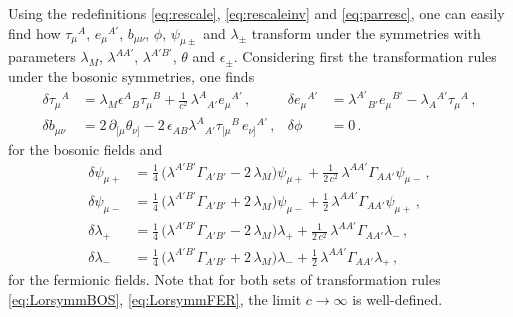 \documentclass[a4paper,10pt,openany]{article}
\begin{document}
	Using the redefinitions \eqref{eq:rescale}, \eqref{eq:rescaleinv} and \eqref{eq:parresc}, one can easily find how $\tau_\mu{}^A$, $e_\mu{}^{A'}$, $b_{\mu\nu}$, $\phi$, $\psi_{\mu\pm}$ and $\lambda_{\pm}$ transform under the symmetries with parameters $\lambda_M$, $\lambda^{AA'}$, $\lambda^{A'B'}$, $\theta$ and $\epsilon_\pm$. Considering first the transformation rules under the bosonic symmetries, one finds
	\begin{subequations}\label{eq:LorsymmBOS}
		\begin{align}
			\delta\tau_\mu{}^A & = \lambda_M\epsilon^A{}_B\tau_\mu{}^B + \frac{1}{c^2}\,\lambda^A{}_{A'}e_\mu{}^{A'}\,, & \delta e_\mu{}^{A'} &= \lambda^{A'}{}_{B'}e_\mu{}^{B'} - \lambda_{A}{}^{A'} \tau_\mu{}^A\,,\\
			\delta b_{\mu\nu} &= 2\,\partial_{[\mu}\theta_{\nu]} - 2\,\epsilon_{AB}\lambda^A{}_{A'}\tau_{[\mu}{}^B\,e_{\nu]}{}^{A'}\,, & \delta\phi &= 0\,.
		\end{align}
	\end{subequations}
	for the bosonic fields and
	\begin{subequations}\label{eq:LorsymmFER}
		\begin{align}
			\delta\psi_{\mu+} &= \frac14\,\big(\lambda^{A'B'}\Gamma_{A'B'}-2\,\lambda_M\big)\psi_{\mu +} + \frac{1}{2\,c^2}\,\lambda^{AA'}\Gamma_{AA'}\psi_{\mu -}\,, \\
			\delta\psi_{\mu-} &= \frac14\,\big(\lambda^{A'B'}\Gamma_{A'B'}+2\,\lambda_M\big)\psi_{\mu -} + \frac{1}{2}\,\lambda^{AA'}\Gamma_{AA'}\psi_{\mu +}\,,\\
			\delta\lambda_+ &= \frac14\,\big(\lambda^{A'B'}\Gamma_{A'B'}-2\,\lambda_M\big)\lambda_+ + \frac{1}{2\,c^2}\,\lambda^{AA'}\Gamma_{AA'}\lambda_-\,,\\
			\delta\lambda_- &= \frac14\,\big(\lambda^{A'B'}\Gamma_{A'B'} + 2\,\lambda_M\big)\lambda_- + \frac{1}{2}\,\lambda^{AA'}\Gamma_{AA'}\lambda_+\,,
		\end{align}
	\end{subequations}
	for the fermionic fields. Note that for both sets of transformation rules \eqref{eq:LorsymmBOS}, \eqref{eq:LorsymmFER}, the limit $c \rightarrow \infty$ is well-defined.
	
\end{document}
